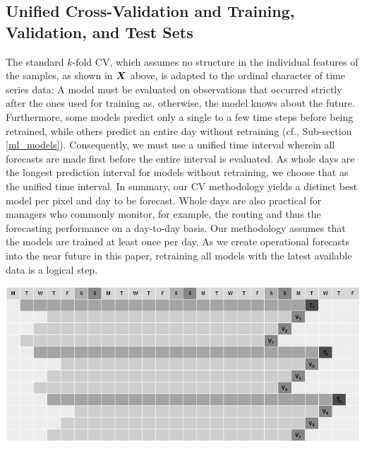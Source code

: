 \subsection{Unified Cross-Validation and Training, Validation, and Test Sets}
\label{unified_cv}

The standard $k$-fold CV, which assumes no structure in the individual
    features of the samples, as shown in $\bm{X}$ above, is adapted to the
    ordinal character of time series data:
A model must be evaluated on observations that occurred strictly after the
    ones used for training as, otherwise, the model knows about the future.
Furthermore, some models predict only a single to a few time steps before
    being retrained, while others predict an entire day without retraining
    (cf., Sub-section \ref{ml_models}).
Consequently, we must use a unified time interval wherein all forecasts are
    made first before the entire interval is evaluated.
As whole days are the longest prediction interval for models without
    retraining, we choose that as the unified time interval.
In summary, our CV methodology yields a distinct best model per pixel and day
    to be forecast.
Whole days are also practical for managers who commonly monitor, for example,
    the routing and thus the forecasting performance on a day-to-day basis.
Our methodology assumes that the models are trained at least once per day.
As we create operational forecasts into the near future in this paper,
    retraining all models with the latest available data is a logical step.

\begin{center}
\label{f:cv}
\includegraphics[width=.8\linewidth]{static/cross_validation_gray.png}
\end{center}

